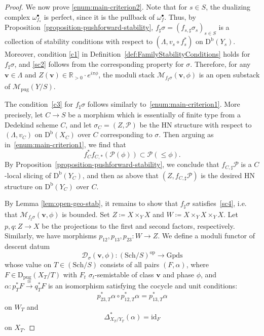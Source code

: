 \documentclass[11pt, reqno]{amsart}
\numberwithin{equation}{section}
\theoremstyle{plain}
\theoremstyle{remark}
\theoremstyle{definition}
\theoremstyle{italicsname}
\newcommand{\bv}{\mathbf{v}}
\newcommand{\Db}{\mathrm{D^b}}
\newcommand{\Dpug}{\mathrm{D_{pug}}}
\newcommand{\cM}{\mathcal{M}}
\newcommand{\cP}{\mathscr{P}}
\def\RR{\ensuremath{\mathbb{R}}}
\begin{document}
\begin{proof}
We now prove \ref{enum:main-criterion2}. 
Note that for $s \in S$, the dualizing complex $\omega^{\bullet}_{f_s}$ is perfect, since it is the pullback of $\omega^{\bullet}_f$. 
Thus, by Proposition~\ref{proposition-pushforward-stability}, $f_\sharp{\sigma}=(f_{s,\sharp}\sigma_s)_{s\in S}$ is a collection of stability conditions with respect to $(\Lambda,v_s\circ f_s^*)$ on $\Db(Y_s)$.
Moreover, condition \ref{c1} in Definition~\ref{def:FamilyStabilityConditions} holds for $f_{\sharp} \sigma$, and \ref{sc2} follows from the corresponding property for ${\sigma}$.  
Therefore, for any $\bv\in\Lambda$ and $Z(\bv)\in\RR_{>0}\cdot e^{i\pi\phi}$, the moduli stack $\cM_{f_{\sharp}{\sigma}}(\bv,\phi)$ is an open substack of $\cM_{\mathrm{pug}}(Y/S)$. 

The condition~\ref{c3} for $f_{\sharp}\sigma$ follows similarly to~\ref{enum:main-criterion1}. 
More precisely, let $C \to S$ be a morphism which is essentially of finite type from a Dedekind scheme $C$, and let $\sigma_C = (Z, \cP)$ be the HN structure with respect to $(\Lambda, v_C)$ on $\Db(X_C)$ over $C$ corresponding to $\sigma$. 
Then arguing as in~\ref{enum:main-criterion1}, we find that 
\begin{equation*}
    f_{C}^*f_{C,*}(\cP(\phi)) \subset \cP(\leq \phi). 
\end{equation*}
By Proposition~\ref{proposition-pushforward-stability}, we conclude that $f_{C, \sharp}\cP$ is a $C$-local slicing of $\Db(Y_C)$, and then as above that $(Z, f_{C, \sharp}\cP)$ is the desired HN structure on $\Db(Y_C)$ over $C$. 

By Lemma \ref{lem:open-geo-stab}, it remains to show that $f_{\sharp}\sigma$ satisfies~\ref{sc4}, i.e. that $\cM_{f_{\sharp}{\sigma}}(\bv,\phi)$ is bounded.
Set $Z\coloneqq X\times_Y X$ and $W\coloneqq X\times_Y X\times_Y X$. 
Let $p,q\colon Z\to X$ be the projections to the first and second factors, respectively. 
Similarly, we have morphisms $p_{12}, p_{13}, p_{23}\colon W\to Z$. 
We define a moduli functor of descent datum
\[
\mathcal{D}_{{\sigma}}(\bv,\phi)\colon (\mathrm{Sch}/S)^{\mathrm{op}}\to \mathrm{Gpds}
\]
whose value on $T\in (\mathrm{Sch}/S)$ consists of all pairs $(F,\alpha)$, where $F\in\Dpug(X_T/T)$ with $F_t$ $\sigma_t$-semistable of class $\bv$ and phase $\phi$, and $\alpha\colon p_{T}^*F\xrightarrow{\cong}q_{T}^*F$ is an isomorphism satisfying the cocycle and unit conditions:
\[
p_{23,T}^*\alpha\circ p_{12,T}^*\alpha= p_{13,T}^*\alpha
\]
on $W_T$ and
\[
\Delta_{X_T/Y_T}^*(\alpha)=\mathrm{id}_F
\]
on $X_T$.


\end{proof}
\end{document}
